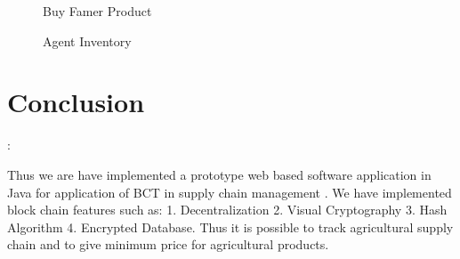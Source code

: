 \documentclass[oneside,a4paper,12pt]{report}
\begin{document}
{\begin{center}
	\begin{figure}[!htbp]
		\centering
		\caption{Buy Famer Product}
		\label{fig:Buy Famer Product}
	\end{figure}
\end{center}

\begin{center}
	\begin{figure}[!htbp]
		\centering
		\caption{Agent Inventory}
		\label{fig:Agent Inventory}
	\end{figure}
\end{center}
\newpage


\chapter{Conclusion}:

Thus we are have implemented a prototype web based software application in Java for application of BCT in supply chain management . We have implemented block chain features such as:
1.	Decentralization
2.	Visual Cryptography
3.	Hash Algorithm
4.	Encrypted Database.
Thus it is possible to track agricultural supply chain and to give minimum price for agricultural products. 
}
\end{document}

